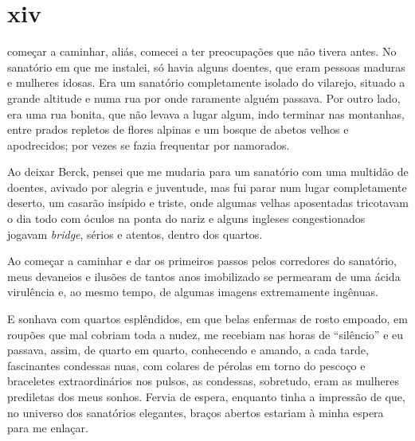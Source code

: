 \section{xiv}

 começar a caminhar, aliás, comecei a ter preocupações que não tivera
antes. No sanatório em que me instalei, só havia alguns doentes, que
eram pessoas maduras e mulheres idosas. Era um sanatório completamente
isolado do vilarejo, situado a grande altitude e numa rua por onde
raramente alguém passava. Por outro lado, era uma rua bonita, que não
levava a lugar algum, indo terminar nas montanhas, entre prados repletos
de flores alpinas e um bosque de abetos velhos e apodrecidos; por vezes
se fazia frequentar por namorados.

Ao deixar Berck, pensei que me mudaria para um sanatório com uma
multidão de doentes, avivado por alegria e juventude, mas fui parar num
lugar completamente deserto, um casarão insípido e triste, onde algumas
velhas aposentadas tricotavam o dia todo com óculos na ponta do nariz e
alguns ingleses congestionados jogavam \textit{bridge}, sérios e atentos, dentro
dos quartos.

Ao começar a caminhar e dar os primeiros passos pelos corredores do
sanatório, meus devaneios e ilusões de tantos anos imobilizado se
permearam de uma ácida virulência e, ao mesmo tempo, de algumas imagens
extremamente ingênuas.


E sonhava com quartos esplêndidos, em que belas enfermas de rosto
empoado, em roupões que mal cobriam toda a nudez, me recebiam nas horas
de ``silêncio'' e eu passava, assim, de quarto em quarto, conhecendo e
amando, a cada tarde, fascinantes condessas nuas, com colares de pérolas
em torno do pescoço e braceletes extraordinários nos pulsos, as
condessas, sobretudo, eram as mulheres prediletas dos meus sonhos.
Fervia de espera, enquanto tinha a impressão de que, no universo dos
sanatórios elegantes, braços abertos estariam à minha espera para me
enlaçar.



